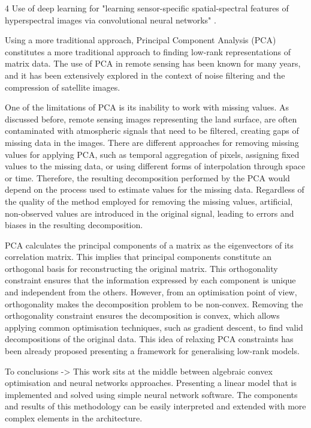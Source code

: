 \documentclass[essd, manuscript]{copernicus}
\begin{document}
4 Use of deep learning for "learning sensor-specific spatial-spectral features of hyperspectral images via convolutional neural networks" \citep{mei2017learning}.

Using a more traditional approach, Principal Component Analysis (PCA) constitutes a more traditional approach to finding low-rank representations of matrix data. The use of PCA in remote sensing has been known for many years, and it has been extensively explored in the context of noise filtering and the compression of satellite images.

One of the limitations of PCA is its inability to work with missing values. As discussed before, remote sensing images representing the land surface, are often contaminated with atmospheric signals that need to be filtered, creating gaps of missing data in the images. There are different approaches for removing missing values for applying PCA, such as temporal aggregation of pixels, assigning fixed values to the missing data, or using different forms of interpolation through space or time. Therefore, the resulting decomposition performed by the PCA would depend on the process used to estimate values for the missing data. Regardless of the quality of the method employed for removing the missing values, artificial, non-observed values are introduced in the original signal, leading to errors and biases in the resulting decomposition.

PCA calculates the principal components of a matrix as the eigenvectors of its correlation matrix. This implies that principal components constitute an orthogonal basis for reconstructing the original matrix. This orthogonality constraint ensures that the information expressed by each component is unique and independent from the others. However, from an optimisation point of view, orthogonality makes the decomposition problem to be non-convex. Removing the orthogonality constraint ensures the decomposition is convex, which allows applying common optimisation techniques, such as gradient descent, to find valid decompositions of the original data. This idea of relaxing PCA constraints has been already proposed \citep{udell2014generalized} presenting a framework for generalising low-rank models.

To conclusions -> This work sits at the middle between algebraic convex optimisation and neural networks approaches. Presenting a linear model that is implemented and solved using simple neural network software. The components and results of this methodology can be easily interpreted and extended with more complex elements in the architecture.
\end{document}
